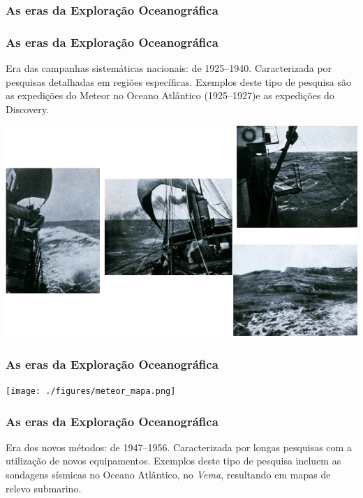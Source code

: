 \documentclass[14pt,xcolor=dvipsnames]{beamer}
\begin{document}
\begin{frame}
    \frametitle{As eras da Exploração Oceanográfica}
    \centerline{}
\end{frame}

\begin{frame}
    \frametitle{As eras da Exploração Oceanográfica}
    \small{Era das campanhas sistemáticas nacionais: de 1925--1940.
    Caracterizada por pesquisas detalhadas em regiões específicas.  Exemplos
    deste tipo de pesquisa são as expedições do Meteor no Oceano Atlântico
    (1925--1927)e as expedições do Discovery.}
    \centerline{\includegraphics[scale=0.35]{./figures/meteor.png}}
\end{frame}

\begin{frame}
    \frametitle{As eras da Exploração Oceanográfica}
    \centerline{\texttt{[image: ./figures/meteor\_mapa.png]}}
\end{frame}

\begin{frame}
    \frametitle{As eras da Exploração Oceanográfica}
    Era dos novos métodos: de 1947--1956.  Caracterizada por longas pesquisas
    com a utilização de novos equipamentos.  Exemplos deste tipo de pesquisa
    incluem as sondagens sísmicas no Oceano Atlântico, no {\it Vema},
    resultando em mapas de relevo submarino.
\end{frame}
\end{document}
